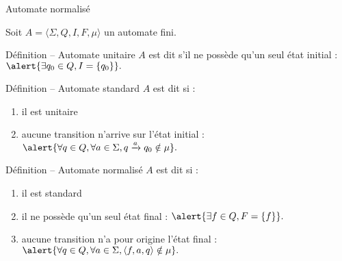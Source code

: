 
\begingroup

\begin{frame}{Automate normalisé}

  Soit $A = \langle \Sigma, Q, I, F, \mu\rangle$ un automate fini. 

  \begin{block}{Définition -- Automate unitaire}
    $A$ est dit  s'il ne possède qu'un seul état initial :
    $\alert{\exists q_0 \in Q, I = \{q_0\}}.$
  \end{block}

  \begin{block}{Définition -- Automate standard}
    $A$ est dit  si :
    \begin{enumerate}
    \item il est \alert{unitaire}
    \item aucune transition n'arrive sur l'état initial :
    $\alert{\forall q\in Q, \forall a\in \Sigma, q \xrightarrow{a} q_0 \notin \mu}.$
    \end{enumerate}
  \end{block}

  \begin{block}{Définition -- Automate normalisé}
    $A$ est dit  si :
    \begin{enumerate}
    \item il est \alert{standard}
    \item il ne possède qu'un seul état final : $\alert{\exists f \in Q, F = \{f\}}.$
    \item aucune transition n'a pour origine l'état final :
    $\alert{\forall q\in Q, \forall a\in \Sigma, \langle f, a, q\rangle \notin \mu}.$
    \end{enumerate}
  \end{block}
\end{frame}
\endgroup
